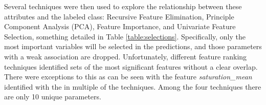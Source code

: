 \documentclass[letterpaper]{report}
\begin{document}
Several techniques were then used to explore the relationship between these attributes and the labeled class: Recursive Feature Elimination, Principle Component Analysis (PCA), Feature Importance, and Univariate Feature Selection, something detailed in Table \ref{table:selections}.  Specifically, only the most important variables will be selected in the predictions, and those parameters with a weak association are dropped. Unfortunately, different feature ranking techniques identified sets of the most significant features without a clear overlap. There were exceptions to this as can be seen with the feature \textit{saturation\_mean} identified with the in multiple of the techniques. Among the four techniques there are only 10 unique parameters.

%
%
%
% 

{
\begin{small}
\renewcommand{\arraystretch}{0.9}
\setlength\LTleft{0pt}
\setlength\LTright{0pt}






\end{small}
}
\end{document}
